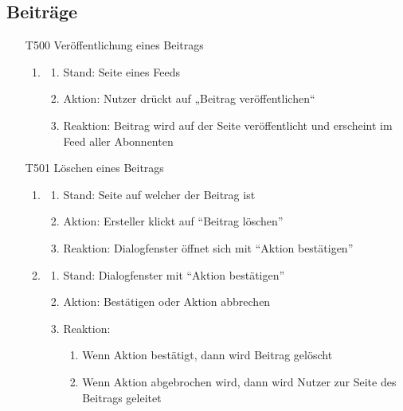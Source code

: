 \documentclass[parskip=full]{scrartcl}
\begin{document}
	\subsection{Beiträge}
	\begin{itemize}
		\item[T500] Veröffentlichung eines Beitrags
		\begin{enumerate}
			\item
			\begin{enumerate}[nosep]	
				\item Stand: Seite eines \gls{Feed}s
				\item Aktion: Nutzer drückt auf „Beitrag veröffentlichen“
				\item Reaktion: Beitrag wird auf der Seite veröffentlicht und erscheint im \gls{Feed} aller \gls{Abonnenten}
			\end{enumerate} 
		\end{enumerate}
		
		
		\item[T501] Löschen eines Beitrags
		\begin{enumerate}
			\item
			\begin{enumerate}[nosep]	
				\item Stand: Seite auf welcher der Beitrag ist
				\item Aktion: Ersteller klickt auf “Beitrag löschen”
				\item Reaktion: Dialogfenster öffnet sich mit “Aktion bestätigen”
			\end{enumerate} 
			\item
			\begin{enumerate}[nosep]	
				\item Stand: Dialogfenster mit “Aktion bestätigen”
				\item Aktion: Bestätigen oder Aktion abbrechen
				\item Reaktion: \begin{enumerate} [nosep]
					\item Wenn Aktion bestätigt, dann wird Beitrag gelöscht
					\item Wenn Aktion abgebrochen wird, dann wird Nutzer zur Seite des Beitrags geleitet
				\end{enumerate}
			\end{enumerate} 
		\end{enumerate}
		

\end{itemize}
\end{document}
